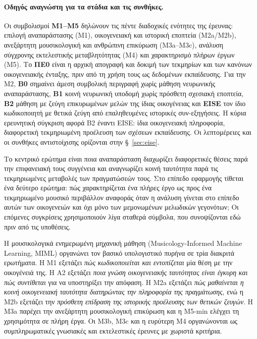 \documentclass[11pt,a4paper]{article}
\begin{document}
\paragraph{Οδηγός αναγνώστη για τα στάδια και τις συνθήκες.}
Οι συμβολισμοί \textbf{M1--M5} δηλώνουν τις πέντε διαδοχικές ενότητες της έρευνας: επιλογή αναπαράστασης (M1), οικογενειακή και ιστορική εποπτεία (M2a/M2b), ανεξάρτητη μουσικολογική και ανθρώπινη επικύρωση (M3a--M3c), ανάλυση σύγχρονης εκτελεστικής μεταβλητότητας (M4) και χαρακτηρισμό πλήρων έργων (M5). Το \textbf{ΠΕ0} είναι η αρχική απογραφή και δοκιμή των τεκμηρίων και των κανόνων οικογενειακής ένταξης, πριν από τη χρήση τους ως δεδομένων εκπαίδευσης. Για την M2, \textbf{B0} σημαίνει άμεση συμβολική περιγραφή χωρίς μάθηση νευρωνικής αναπαράστασης, \textbf{B1} κοινή νευρωνική υποδομή χωρίς πρόσθετη σχεσιακή εποπτεία, \textbf{B2} μάθηση με ζεύγη επικυρωμένων μελών της ίδιας οικογένειας και \textbf{EISE} τον ίδιο κωδικοποιητή με θετικά ζεύγη από επαληθευμένες ιστορικές συν-εξηγήσεις. Η κύρια ερευνητική σύγκριση αφορά B2 έναντι EISE: ίδια οικογενειακή πληροφορία, διαφορετική τεκμηριωμένη προέλευση των σχέσεων εκπαίδευσης. Οι λεπτομέρειες και οι συνθήκες αντιστοίχισης ορίζονται στην §~\ref{sec:eise}.


Το κεντρικό ερώτημα είναι ποια αναπαράσταση διαχωρίζει διαφορετικές θέσεις παρά την επιφανειακή τους συγγένεια και αναγνωρίζει κοινή ταυτότητα παρά τις τεκμηριωμένες μεταβολές των πραγματώσεών τους. Στο επίπεδο εφαρμογής τίθεται ένα δεύτερο ερώτημα: πώς χαρακτηρίζεται ένα πλήρες έργο ως προς ένα τεκμηριωμένο μουσικό περιβάλλον αναφοράς όταν η ανάλυση γίνεται στο επίπεδο αυτών των οικογενειών και όχι μόνο των μεμονωμένων μελωδικών γεγονότων; Οι επόμενες συγκρίσεις χρησιμοποιούν λίγα σταθερά σύμβολα, που συνοψίζονται εδώ πριν από τις υποθέσεις.

Η μουσικολογικά ενημερωμένη μηχανική μάθηση (Musicology-Informed Machine Learning, MIML) οργανώνει τον βασικό υπολογιστικό πυρήνα σε τρία διακριτά ερωτήματα. Η Μ1 εξετάζει \emph{πώς κωδικοποιείται και εντοπίζεται} μία θέση με την οικογένειά της. Η Α2 εξετάζει \emph{ποια γνώση οικογενειακής ταυτότητας είναι έγκυρη και πώς συντίθεται} για να υποστηρίξει την απόφαση. Η Μ2a εξετάζει \emph{πώς μαθαίνεται η κοινή οικογενειακή ταυτότητα διατηρώντας την πληροφορία της πραγμάτωσης}, ενώ η Μ2b εξετάζει την \emph{πρόσθετη επίδραση της ιστορικής προέλευσης των θετικών ζευγών}. Η Μ3a παρέχει την ανεξάρτητη μουσικολογική επικύρωση και η Μ5-min ελέγχει τη χρησιμότητα σε πλήρη έργα. Οι M3b, M3c και η ευρύτερη M4 οργανώνονται ως συμπληρωματικές γνωσιακές και εκτελεστικές έρευνες με χωριστά κριτήρια.
\end{document}
